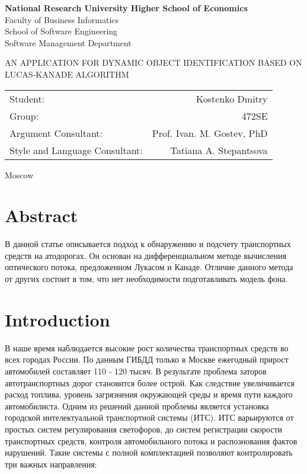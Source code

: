 \documentclass[12pt,a4paper,oneside,titlepage]{article}
\author{Kostenko}
\begin{document}
{
\thispagestyle{empty}
\newpage
\centering

\textbf{
National Research University Higher School of Economics\\
}
Faculty of Business Informatics\\
School of Software Engineering\\
Software Management Department

\vfill


\begin{large}
\MakeTextUppercase{
An Application for Dynamic Object Identification Based on Lucas-Kanade Algorithm
}
\end{large}


\vfill

\begin{tabular}{lr}
Student: & Kostenko Dmitry \\
Group: & 472SE \\
Argument Consultant: & Prof. Ivan. M. Gostev, PhD \\
Style and Language Consultant: & Tatiana A. Stepantsova
\end{tabular}

\vspace{\fill}

Moscow\\ \number\year
\clearpage
}

\section*{Abstract}
{
В данной статье описывается подход к обнаружению и подсчету транспортных средств на атодорогах.
Он основан на дифференциальном методе вычисления оптического потока, предложенном Лукасом и Канаде.
Отличие данного метода от других состоит в том, что нет необходимости подготавливать модель фона.
}


{
\newpage
\centering
\tableofcontents
}


\newpage
\section*{Introduction}
В наше время наблюдается высокие рост количества транспортных средств во всех городах России.
По данным ГИБДД только в Москве ежегодный прирост автомобилей составляет 110 - 120 тысяч.
В результате проблема заторов автотранспортных дорог становится более острой.
Как следствие увеличивается расход топлива, уровень загрязнения окружающей среды и время пути каждого автомобилиста.
Одним из решений данной проблемы является установка городской интелектуальной транспортной системы (ИТС).
ИТС варьируются от простых систем регулирования светофоров, до систем регистрации скорости транспортных средств, контроля автомобильного потока и распознования фактов нарушений.
Такие системы с полной комплектацией позволяют контролировать три важных направления:
\end{document}

